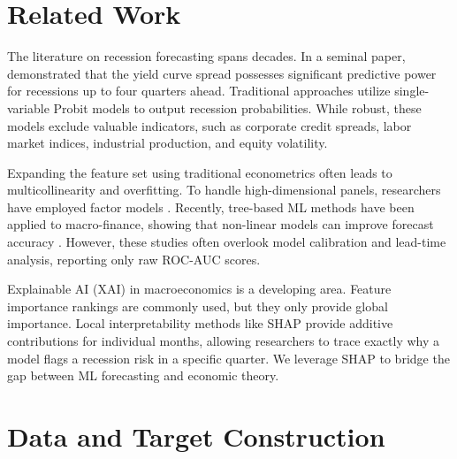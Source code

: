 \documentclass[11pt]{article}
\begin{document}
\section{Related Work}
The literature on recession forecasting spans decades. In a seminal paper, \citet{estella1998predicting} demonstrated that the yield curve spread possesses significant predictive power for recessions up to four quarters ahead. Traditional approaches utilize single-variable Probit models to output recession probabilities. While robust, these models exclude valuable indicators, such as corporate credit spreads, labor market indices, industrial production, and equity volatility.

Expanding the feature set using traditional econometrics often leads to multicollinearity and overfitting. To handle high-dimensional panels, researchers have employed factor models \citep{stock2002forecasting}. Recently, tree-based ML methods have been applied to macro-finance, showing that non-linear models can improve forecast accuracy \citep{he2021machine}. However, these studies often overlook model calibration and lead-time analysis, reporting only raw ROC-AUC scores.

Explainable AI (XAI) in macroeconomics is a developing area. Feature importance rankings are commonly used, but they only provide global importance. Local interpretability methods like SHAP \citep{shap2017} provide additive contributions for individual months, allowing researchers to trace exactly why a model flags a recession risk in a specific quarter. We leverage SHAP to bridge the gap between ML forecasting and economic theory.

\section{Data and Target Construction}
\end{document}

